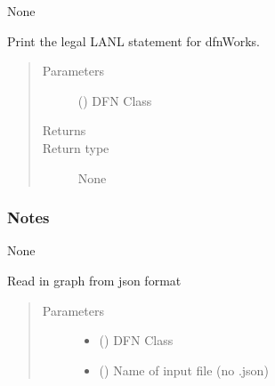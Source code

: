 \documentclass[letterpaper,10pt,english]{sphinxmanual}
\begin{document}
\begin{fulllineitems}
\begin{fulllineitems}
None

\end{fulllineitems}


\begin{fulllineitems}
\label{\detokenize{pydfnworks:pydfnworks.general.dfnworks.DFNWORKS.legal}}
Print the legal LANL statement for dfnWorks.
\begin{quote}\begin{description}
\item[{Parameters}] \leavevmode
{} () \textendash{} DFN Class

\item[{Returns}] \leavevmode


\item[{Return type}] \leavevmode
None

\end{description}\end{quote}
\subsubsection*{Notes}

None

\end{fulllineitems}


\begin{fulllineitems}
\label{\detokenize{pydfnworks:pydfnworks.general.dfnworks.DFNWORKS.load_json_graph}}
Read in graph from json format
\begin{quote}\begin{description}
\item[{Parameters}] \leavevmode\begin{itemize}
\item {} 
 () \textendash{} DFN Class

\item {} 
 () \textendash{} Name of input file (no .json)


\end{itemize}
\end{description}
\end{quote}
\end{fulllineitems}
\end{fulllineitems}
\end{document}
